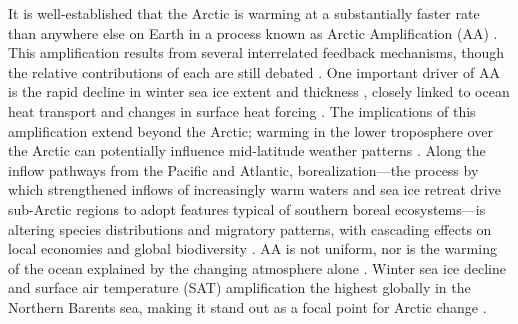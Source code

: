 \documentclass[draft]{agujournal2019}
\begin{document}
It is well-established that the Arctic is warming at a substantially faster rate than anywhere else on Earth in a process known as Arctic Amplification (AA) \cite{Manabe1980,Serreze2009,Cosimo2014,Huang2017,Rantanen2022}. This amplification results from several interrelated feedback mechanisms, though the relative contributions of each are still debated \cite{Pithan2014,Timmermans2018,Gong2017,Pistone2019,Previdi2021}. One important driver of AA is the rapid decline in winter sea ice extent and thickness \cite{Perovich2009,Dai2019}, closely linked to ocean heat transport and changes in surface heat forcing \cite{Onarheim2018,Stroeve2018,Oldenburg2024}. The implications of this amplification extend beyond the Arctic; warming in the lower troposphere over the Arctic can potentially influence mid-latitude weather patterns \cite{Honda2009,Petoukhov2010,Francis2012,Cohen2018,Coumou2018}. Along the inflow pathways from the Pacific and Atlantic, borealization—the process by which strengthened inflows of increasingly warm waters and sea ice retreat drive sub-Arctic regions to adopt features typical of southern boreal ecosystems—is altering species distributions and migratory patterns, with cascading effects on local economies and global biodiversity \cite{Fossheim2015,Polyakov2020_borealization,Ingvaldsen2021,Husson2024}. AA is not uniform, nor is the warming of the ocean explained by the changing atmosphere alone \cite{Marshall2014}. Winter sea ice decline and surface air temperature (SAT) amplification the highest globally in the Northern Barents sea, making it stand out as a focal point for Arctic change \cite{Screen2010,Onarheim2017,Isaksen2022,Rantanen2022}.
\end{document}
